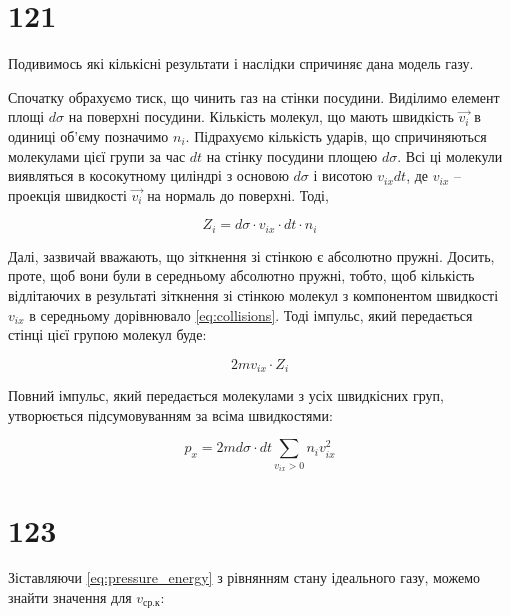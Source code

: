 \section{121}

Подивимось які кількісні результати і наслідки спричиняє дана модель газу.

Спочатку обрахуємо тиск, що чинить газ на стінки посудини. Виділимо елемент площі $d\sigma$ на
поверхні посудини. Кількість молекул, що мають швидкість $\vec{v_i}$ в одиниці об'єму позначимо $n_i$.
Підрахуємо кількість ударів, що спричиняються молекулами цієї групи за час $dt$ на стінку посудини
площею $d\sigma$. Всі ці молекули виявляться в косокутному циліндрі з основою $d\sigma$ і висотою
$v_{ix}dt$, де $v_{ix}$ -- проекція швидкості $\vec{v_i}$ на нормаль до поверхні. Тоді,

\begin{equation}\label{eq:collisions}
    Z_i = d\sigma \cdot v_{ix} \cdot dt \cdot n_i
\end{equation}

Далі, зазвичай вважають, що зіткнення зі стінкою є абсолютно пружні. Досить, проте, щоб вони були в
середньому абсолютно пружні, тобто, щоб кількість відлітаючих в результаті зіткнення зі стінкою
молекул з компонентом швидкості $v_{ix}$ в середньому дорівнювало \eqref{eq:collisions}. Тоді імпульс,
який передається стінці цієї групою молекул буде:

\begin{equation}\label{eq:momentum}
    2mv_{ix} \cdot Z_i
\end{equation}

Повний імпульс, який передається молекулами з усіх швидкісних груп, утворюється підсумовуванням за
всіма швидкостями:

\begin{equation}\label{eq:total_momentum}
    p_x = 2m d\sigma \cdot dt \sum_{v_{ix} > 0} n_i v_{ix}^2
\end{equation}

\section{123}

Зіставляючи \eqref{eq:pressure_energy} з рівнянням стану ідеального газу, можемо знайти значення для
$v_{\text{ср.к}}$:

